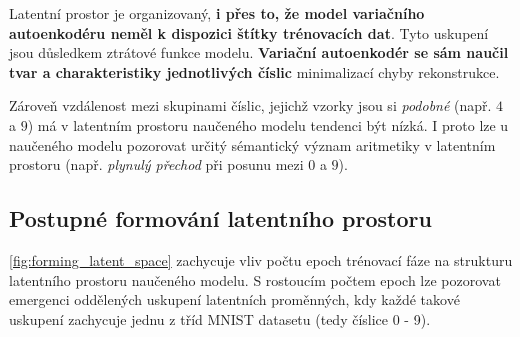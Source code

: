 Latentní prostor je organizovaný, \textbf{i přes to, že model variačního autoenkodéru neměl k dispozici štítky trénovacích dat}. 
Tyto uskupení jsou důsledkem ztrátové funkce modelu.
\textbf{Variační autoenkodér se sám naučil tvar a charakteristiky jednotlivých číslic} minimalizací chyby rekonstrukce.

Zároveň vzdálenost mezi skupinami číslic, jejichž vzorky jsou si \emph{podobné} (např. $4$ a $9$) má v latentním prostoru naučeného modelu tendenci být nízká.
I proto lze u naučeného modelu pozorovat určitý sémantický význam aritmetiky v latentním prostoru (např. \emph{plynulý přechod} při posunu mezi $0$ a $9$).

\subsection{Postupné formování latentního prostoru}
\label{sec:latent_space_development}
\autoref{fig:forming_latent_space} zachycuje vliv počtu epoch trénovací fáze na strukturu latentního prostoru naučeného modelu.
S rostoucím počtem epoch lze pozorovat emergenci oddělených uskupení latentních proměnných, kdy každé takové uskupení zachycuje jednu z tříd MNIST datasetu (tedy číslice 0 - 9).

